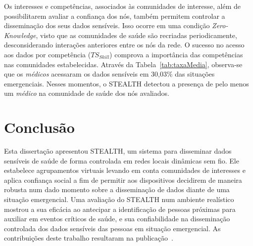 \documentclass[12pt]{article}
\begin{document}
Os interesses e competências, associados às comunidades de interesse, além de possibilitarem avaliar a confiança dos nós, também permitem controlar a disseminação dos seus dados sensíveis. Isso ocorre em uma condição \textit{Zero-Knowledge}, visto que as comunidades de saúde são recriadas periodicamente, desconsiderando interações anteriores entre os nós da rede. O sucesso no acesso aos dados por competência ($TS_{Skill}$) comprova a importância das competências nas comunidades estabelecidas. Através da Tabela~\ref{tab:taxaMedia}, observa-se que os \textit{médicos} acessaram os dados sensíveis em 30,03\% das situações emergenciais. Nesses momentos, o \mbox{STEALTH} detectou a presença de pelo menos um \textit{médico} na comunidade de saúde dos nós avaliados.

\vspace{-0.2cm}

\section{Conclusão}
\label{sec:conc}

Esta dissertação apresentou \mbox{STEALTH}, um sistema para disseminar dados sensíveis de saúde de forma controlada em redes locais dinâmicas sem fio. Ele estabelece agrupamentos virtuais levando em conta comunidades de interesses e aplica confiança social a fim de permitir aos dispositivos decidirem de maneira robusta num dado momento sobre a disseminação de dados diante de uma situação emergencial. Uma avaliação do \mbox{STEALTH} num ambiente realístico mostrou a sua eficácia ao antecipar a identificação de pessoas próximas para auxiliar em eventos críticos de saúde, e sua confiabilidade na disseminação controlada dos dados sensíveis das pessoas em situação emergencial. As contribuições deste trabalho resultaram na publicação~\cite{batista2019sbseg}.

\small


\end{document}
